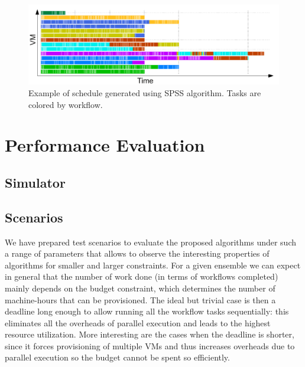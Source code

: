 \documentclass{sig-alternate}
\begin{document}
\begin{figure}[htb] 
\centering
\includegraphics[width=1.0\columnwidth]{figures/spss-gantt}
 \caption{Example of schedule generated using SPSS algorithm. Tasks are colored by workflow. }
\label{fig:spss-example}
\end{figure}


\section{Performance Evaluation}

\subsection{Simulator}

\subsection{Scenarios}
\label{sec:scenarios}

We have prepared test scenarios to evaluate the proposed algorithms under
such a range of parameters that allows to observe the interesting properties of
algorithms for smaller and larger constraints. For a given ensemble we can
expect in general that the number of work done (in terms of workflows completed)
mainly depends on the budget constraint, which determines the number of
machine-hours that can be provisioned. The ideal but trivial case is then a
deadline long enough to allow running all the workflow tasks sequentially: this
eliminates all the overheads of parallel execution and leads to the highest
resource utilization. More interesting are the cases when the deadline is
shorter, since it forces provisioning of multiple VMs and thus increases
overheads due to parallel execution so the budget cannot be spent so
efficiently.
\end{document}
